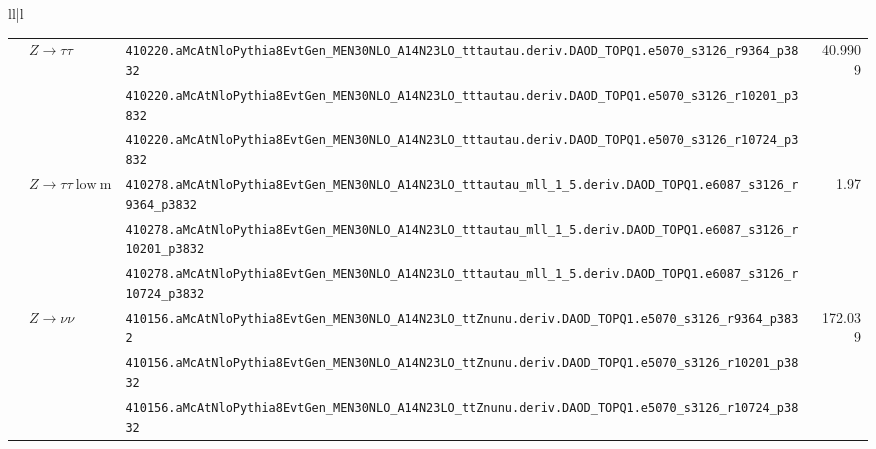 \begin{table}[htbp]
{\begin{tabular}{ll|l}
\begin{table}[htbp]
{\begin{tabular}{ll|l|r}
                         & \multirow{3}{*}{$Z\to \tau\tau$}                & \verb|410220.aMcAtNloPythia8EvtGen_MEN30NLO_A14N23LO_tttautau.deriv.DAOD_TOPQ1.e5070_s3126_r9364_p3832|          & \multirow{3}{*}{40.9909} \\
                         &                                                 & \verb|410220.aMcAtNloPythia8EvtGen_MEN30NLO_A14N23LO_tttautau.deriv.DAOD_TOPQ1.e5070_s3126_r10201_p3832|         & \\
                         &                                                 & \verb|410220.aMcAtNloPythia8EvtGen_MEN30NLO_A14N23LO_tttautau.deriv.DAOD_TOPQ1.e5070_s3126_r10724_p3832|         & \\ \cline{2-4}

                         & \multirow{3}{*}{$Z\to \tau\tau\mathrm{~low~m}$} & \verb|410278.aMcAtNloPythia8EvtGen_MEN30NLO_A14N23LO_tttautau_mll_1_5.deriv.DAOD_TOPQ1.e6087_s3126_r9364_p3832|  & \multirow{3}{*}{1.97} \\
                         &                                                 & \verb|410278.aMcAtNloPythia8EvtGen_MEN30NLO_A14N23LO_tttautau_mll_1_5.deriv.DAOD_TOPQ1.e6087_s3126_r10201_p3832| & \\
                         &                                                 & \verb|410278.aMcAtNloPythia8EvtGen_MEN30NLO_A14N23LO_tttautau_mll_1_5.deriv.DAOD_TOPQ1.e6087_s3126_r10724_p3832| & \\ \cline{2-4}

                         & \multirow{3}{*}{$Z\to \nu\nu$}                  & \verb|410156.aMcAtNloPythia8EvtGen_MEN30NLO_A14N23LO_ttZnunu.deriv.DAOD_TOPQ1.e5070_s3126_r9364_p3832|           & \multirow{3}{*}{172.039} \\
                         &                                                 & \verb|410156.aMcAtNloPythia8EvtGen_MEN30NLO_A14N23LO_ttZnunu.deriv.DAOD_TOPQ1.e5070_s3126_r10201_p3832|          & \\
                         &                                                 & \verb|410156.aMcAtNloPythia8EvtGen_MEN30NLO_A14N23LO_ttZnunu.deriv.DAOD_TOPQ1.e5070_s3126_r10724_p3832|          & \\ \cline{2-4}


\end{tabular}}
\end{table}
\end{tabular}}
\end{table}
